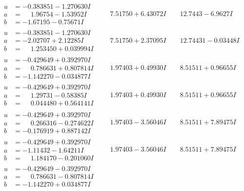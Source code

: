 \documentclass[1p]{elsarticle_modified}
\theoremstyle{definition}
\begin{document}
$$\begin{array}{c|c|c}
\begin{aligned}
u &= -0.383851 - 1.270630 I \\
a &= \phantom{-}1.96754 - 1.53952 I \\
b &= -1.67195 - 0.75671 I\end{aligned}
 & \phantom{-}7.51750 + 6.43072 I & \phantom{-}12.7443 - 6.9627 I \\ \hline\begin{aligned}
u &= -0.383851 - 1.270630 I \\
a &= -2.02707 + 2.12285 I \\
b &= \phantom{-}1.253450 + 0.039994 I\end{aligned}
 & \phantom{-}7.51750 + 2.37095 I & \phantom{-}12.74431 - 0.03448 I \\ \hline\begin{aligned}
u &= -0.429649 + 0.392970 I \\
a &= \phantom{-}0.786631 + 0.807814 I \\
b &= -1.142270 - 0.034877 I\end{aligned}
 & \phantom{-}1.97403 + 0.49930 I & \phantom{-}8.51511 + 0.96655 I \\ \hline\begin{aligned}
u &= -0.429649 + 0.392970 I \\
a &= \phantom{-}1.29731 - 0.58385 I \\
b &= \phantom{-}0.044480 + 0.564141 I\end{aligned}
 & \phantom{-}1.97403 + 0.49930 I & \phantom{-}8.51511 + 0.96655 I \\ \hline\begin{aligned}
u &= -0.429649 + 0.392970 I \\
a &= \phantom{-}0.266316 - 0.274622 I \\
b &= -0.176919 + 0.887142 I\end{aligned}
 & \phantom{-}1.97403 - 3.56046 I & \phantom{-}8.51511 + 7.89475 I \\ \hline\begin{aligned}
u &= -0.429649 + 0.392970 I \\
a &= -1.11432 - 1.64211 I \\
b &= \phantom{-}1.184170 - 0.201060 I\end{aligned}
 & \phantom{-}1.97403 - 3.56046 I & \phantom{-}8.51511 + 7.89475 I \\ \hline\begin{aligned}
u &= -0.429649 - 0.392970 I \\
a &= \phantom{-}0.786631 - 0.807814 I \\
b &= -1.142270 + 0.034877 I\end{aligned}

\end{array}$$
\end{document}
